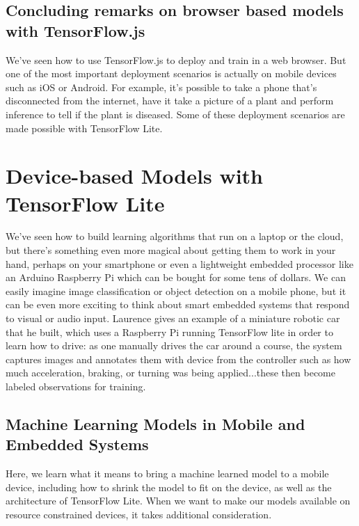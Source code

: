 \documentclass[12pt]{article}
\begin{document}
\subsection{Concluding remarks on browser based models with TensorFlow.js}
We've seen how to use TensorFlow.js to deploy and train in a web browser. But one of the most important
deployment scenarios is actually on mobile devices such as iOS or Android. For example, it's possible to
take a phone that's disconnected from the internet, have it take a picture of a plant and perform inference
to tell if the plant is diseased. Some of these deployment scenarios are made possible with TensorFlow Lite.

\section{Device-based Models with TensorFlow Lite} We've seen how to build learning algorithms that run
on a laptop or the cloud, but there's something even more magical about getting them to work
in your hand, perhaps on your smartphone or even a lightweight embedded processor like an Arduino
Raspberry Pi which can be bought for some tens of dollars. We can easily imagine image classification or
object detection on a mobile phone, but it can be even more exciting to think about smart embedded systems
that respond to visual or audio input. Laurence gives an example of a miniature robotic car that he built,
which uses a Raspberry Pi running TensorFlow lite in order to learn how to drive: as one manually drives the
car around a course, the system captures images and annotates them with device from the controller such
as how much acceleration, braking, or turning was being applied...these then become labeled observations for
training.

\subsection{Machine Learning Models in Mobile and Embedded Systems} Here, we learn what it means to bring a machine
learned model to a mobile device, including how to shrink the model to fit on the device, as well as the
architecture of TensorFlow Lite. When we want to make our models available on resource constrained devices,
it takes additional consideration.
\end{document}
